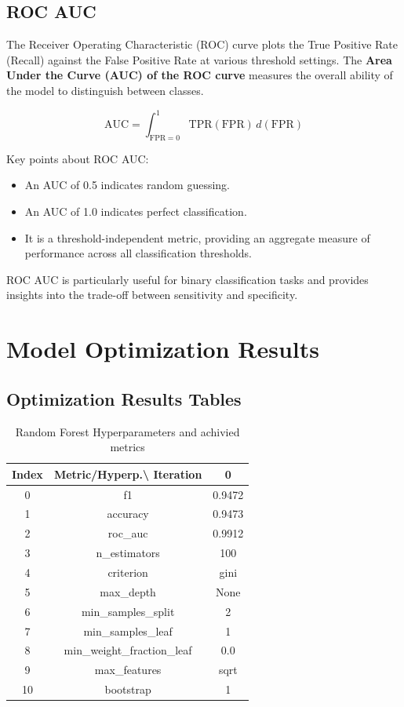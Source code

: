 \documentclass{article}%
\begin{document}
%
\subsection{ROC AUC}%
\label{subsec:ROCAUC}%

                The Receiver Operating Characteristic (ROC) curve plots the True Positive Rate (Recall) against the False Positive Rate at various threshold settings. 
                The \textbf{Area Under the Curve (AUC) of the ROC curve} measures the overall ability of the model to distinguish between classes. 

                \[
                \text{AUC} = \int_{\text{FPR}=0}^{1} \text{TPR}(\text{FPR}) \, d(\text{FPR})
                \]

                Key points about ROC AUC:
                \begin{itemize}
                    \item An AUC of 0.5 indicates random guessing.
                    \item An AUC of 1.0 indicates perfect classification.
                    \item It is a threshold-independent metric, providing an aggregate measure of performance across all classification thresholds.
                \end{itemize}

                ROC AUC is particularly useful for binary classification tasks and provides insights into the trade-off between sensitivity and specificity.
                

%
\newpage%
\section{Model Optimization Results}%
\label{sec:ModelOptimizationResults}%
\subsection{Optimization Results Tables}%
\label{subsec:OptimizationResultsTables}%


\begin{table}[h!]%
\caption{Random Forest Hyperparameters and achivied metrics}%
\vspace{0.2cm}%
\centering%
\begin{tabular}{|c||c||c|}%
\hline%
Index&Metric/Hyperp.\textbackslash{} Iteration&0\\%
\hline%
0&f1&0.9472\\%
1&accuracy&0.9473\\%
2&roc\_auc&0.9912\\%
3&n\_estimators&100\\%
4&criterion&gini\\%
5&max\_depth&None\\%
6&min\_samples\_split&2\\%
7&min\_samples\_leaf&1\\%
8&min\_weight\_fraction\_leaf&0.0\\%
9&max\_features&sqrt\\%
10&bootstrap&1\\%
\hline%
\end{tabular}%
\end{table}
\end{document}
